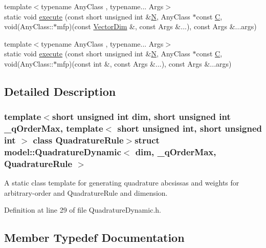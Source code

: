 \begin{DoxyCompactItemize}
\item 
{\footnotesize template$<$typename Any\+Class , typename... Args$>$ }\\static void \hyperlink{structmodel_1_1_quadrature_dynamic_a539a70e72ba84dc0efefafbb8cab382d}{execute} (const short unsigned int \&\hyperlink{thompson__tetrahedron_8m_a7823765a845eb81829f110d8337f81ae}{N}, Any\+Class $\ast$const \hyperlink{plot_cells_8m_aaa53ca0b650dfd85c4f59fa156f7a2cc}{C}, void(Any\+Class\+::$\ast$mfp)(const \hyperlink{structmodel_1_1_quadrature_dynamic_a938d089d4cea5e1029076fbf5801521a}{Vector\+Dim} \&, const Args \&...), const Args \&...args)
\item 
{\footnotesize template$<$typename Any\+Class , typename... Args$>$ }\\static void \hyperlink{structmodel_1_1_quadrature_dynamic_aef598222997d9d505f8655da5ac5756c}{execute} (const short unsigned int \&\hyperlink{thompson__tetrahedron_8m_a7823765a845eb81829f110d8337f81ae}{N}, Any\+Class $\ast$const \hyperlink{plot_cells_8m_aaa53ca0b650dfd85c4f59fa156f7a2cc}{C}, void(Any\+Class\+::$\ast$mfp)(const int \&, const Args \&...), const Args \&...args)
\end{DoxyCompactItemize}


\subsection{Detailed Description}
\subsubsection*{template$<$short unsigned int dim, short unsigned int \+\_\+q\+Order\+Max, template$<$ short unsigned int, short unsigned int $>$ class Quadrature\+Rule$>$struct model\+::\+Quadrature\+Dynamic$<$ dim, \+\_\+q\+Order\+Max, Quadrature\+Rule $>$}

A static class template for generating quadrature abcsissas and weights for arbitrary-\/order and Quadrature\+Rule and dimension. 

Definition at line 29 of file Quadrature\+Dynamic.\+h.



\subsection{Member Typedef Documentation}
\hypertarget{structmodel_1_1_quadrature_dynamic_a938d089d4cea5e1029076fbf5801521a}{}
